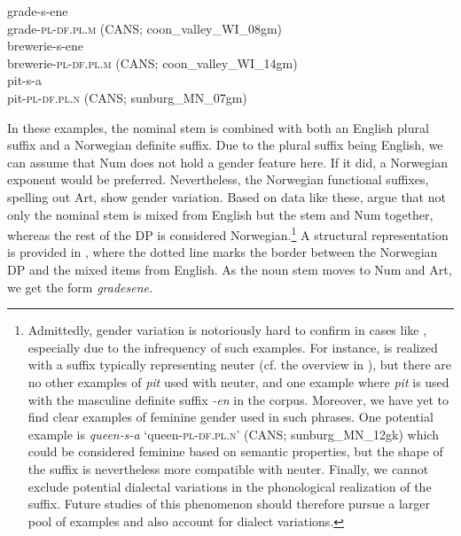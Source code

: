 \documentclass[output=paper]{langscibook}
\begin{document}
\ea \label{ex:riksem:11}
\ea \label{ex:riksem:11a}
	\gll grade-s-ene\\
		grade-\textsc{pl-df.pl.m} (CANS; %
        coon\_valley\_WI\_08gm)\\
\ex \label{ex:riksem:11b}
	\gll brewerie-s-ene\\
		 brewerie-\textsc{pl-df.pl.m} (CANS; %
         coon\_valley\_WI\_14gm)\\
\ex \label{ex:riksem:11c}
	\gll pit-s-a\\
		 pit-\textsc{pl-df.pl.n} (CANS; %
         sunburg\_MN\_07gm)\\
\z
\z

In these examples, the nominal stem is combined with both an English plural suffix and a Norwegian definite suffix. Due to the plural suffix being English, we can assume that Num does not hold a gender feature here. If it did, a Norwegian exponent would be preferred. Nevertheless, the Norwegian functional suffixes, spelling out Art, show gender variation. Based on data like these, \citet{ÅfarliEtAl2021} argue that not only the nominal stem is mixed from English but the stem and Num together, whereas the rest of the DP is considered Norwegian.\footnote{ \textrm{Admittedly, gender variation is notoriously hard to confirm in cases like , especially due to the infrequency of such examples. For instance,  is realized with a suffix typically representing neuter (cf. the overview in ), but there are no other examples of} \textrm{\textit{pit}} \textrm{used with neuter, and one example where} \textrm{\textit{pit}} \textrm{is used with the masculine definite suffix} \textrm{\textit{{}-en} }\textrm{in the corpus. Moreover, we have yet to find clear examples of feminine gender used in such phrases. One potential example is} \textrm{\textit{queen-s-a} }\textrm{‘queen-}\textrm{\textsc{pl-df.pl.n’} }\textrm{(CANS; sunburg\_MN\_12gk) which could be considered feminine based on semantic properties, but the shape of the suffix is nevertheless more compatible with neuter. Finally, we cannot exclude potential dialectal variations in the phonological realization of the suffix. Future studies of this phenomenon should therefore pursue a larger pool of examples and also account for dialect variations.} } A structural representation is provided in , where the dotted line marks the border between the Norwegian DP and the mixed items from English. As the noun stem moves to Num and Art, we get the form \textit{gradesene.} 
\end{document}
